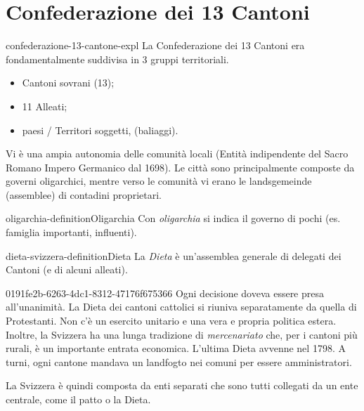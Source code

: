 \documentclass[preview]{standalone}
\begin{document}
\genpage

\section{Confederazione dei 13 Cantoni}

\begin{snippet}{confederazione-13-cantone-expl}
    La Confederazione dei 13 Cantoni era fondamentalmente suddivisa in 3 gruppi territoriali.
    \begin{itemize}
        \item Cantoni sovrani (13);
        \item 11 Alleati;
        \item paesi / Territori soggetti, (baliaggi).
    \end{itemize}

    Vi è una ampia autonomia delle comunità locali (Entità indipendente del Sacro Romano Impero Germanico dal 1698).
    Le città sono principalmente composte da governi oligarchici, mentre verso le comunità
    vi erano le landsgemeinde (assemblee) di contadini proprietari.
\end{snippet}

\begin{snippetdefinition}{oligarchia-definition}{Oligarchia}
    Con \textit{oligarchia} si indica il governo di pochi (es. famiglia importanti, influenti).
\end{snippetdefinition}


\begin{snippetdefinition}{dieta-svizzera-definition}{Dieta}
    La \textit{Dieta} è un'assemblea generale di delegati dei Cantoni (e di alcuni alleati).
\end{snippetdefinition}

\begin{snippet}{0191fe2b-6263-4dc1-8312-47176f675366}
    Ogni decisione doveva essere presa all'unanimità.
    La Dieta dei cantoni cattolici si riuniva separatamente da quella di Protestanti.
    Non c'è un esercito unitario e una vera e propria politica estera.
    Inoltre, la Svizzera ha una lunga tradizione di \textit{mercenariato} che, per i cantoni più rurali,
    è un importante entrata economica.
    L'ultima Dieta avvenne nel 1798.
    A turni, ogni cantone mandava un landfogto nei comuni per essere amministratori.
    
    La Svizzera è quindi composta da enti separati che sono tutti collegati da un ente centrale, come il patto o la Dieta.
\end{snippet}
\end{document}
